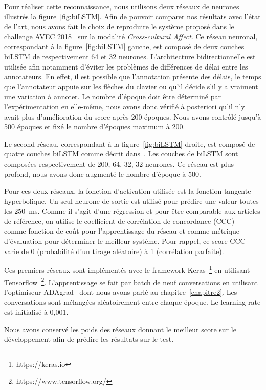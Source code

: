 Pour réaliser cette reconnaissance, nous utilisons deux réseaux de neurones illustrés la figure~\ref{fig:biLSTM}. Afin de pouvoir comparer nos résultats avec l'état de l'art, nous avons fait le choix de reproduire le système proposé dans le challenge AVEC 2018~\cite{AVEC2018} sur la modalité \textit{Cross-cultural Affect}. Ce réseau neuronal, correspondant à la figure~\ref{fig:biLSTM} gauche, est composé de deux couches biLSTM de respectivement 64 et 32 neurones. L'architecture bidirectionnelle est utilisée afin notamment d'éviter les problèmes de différences de délai entre les annotateurs. En effet, il est possible que l'annotation présente des délais, le temps que l'annotateur appuie sur les flèches du clavier ou qu'il décide s'il y a vraiment une variation à annoter. Le nombre d'époque doit être déterminé par l'expérimentation en elle-même, nous avons donc vérifié à posteriori qu'il n'y avait plus d'amélioration du score après 200 époques. Nous avons contrôlé jusqu'à 500 époques et fixé le nombre d'époques maximum à 200.

Le second réseau, correspondant à la figure~\ref{fig:biLSTM} droite, est composé de quatre couches biLSTM comme décrit dans~\cite{Schmitt2019}. Les couches de biLSTM sont composées respectivement de 200, 64, 32, 32 neurones. Ce réseau est plus profond, nous avons donc augmenté le nombre d'époque à 500.

Pour ces deux réseaux, la fonction d'activation utilisée est la fonction tangente hyperbolique. Un seul neurone de sortie est utilisé pour prédire une valeur toutes les 250~ms. Comme il s'agit d'une régression et pour être comparable aux articles de référence, on utilise le coefficient de corrélation de concordance (CCC)~\cite{CCC} comme fonction de coût pour l'apprentissage du réseau et comme métrique d'évaluation pour déterminer le meilleur système.
Pour rappel, ce score CCC varie de 0 (probabilité d'un tirage aléatoire) à 1 (corrélation parfaite).



Ces premiers réseaux sont implémentés avec le framework Keras~\footnote{https://keras.io} en utilisant Tensorflow~\footnote{https://www.tensorflow.org/}. L'apprentissage se fait par batch de neuf conversations en utilisant l'optimiseur ADAgrad~\cite{Duchi2011} dont nous avons parlé au chapitre~\ref{chapitre2}. Les conversations sont mélangées aléatoirement entre chaque époque. Le learning rate est initialisé à 0,001.

Nous avons conservé les poids des réseaux donnant le meilleur score sur le développement afin de prédire les résultats sur le test.

